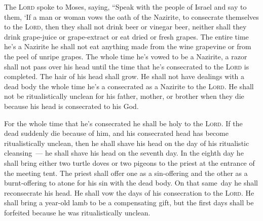 
\begin{inparaenum}
     The \textsc{Lord} spoke to Moses, saying,%
     ``Speak with the people of Israel and say to them, `If a man or woman vows the oath of the Nazirite, to consecrate themselves to the \textsc{Lord},%
     then they shall not drink beer or vinegar beer, neither shall they drink grape-juice or grape-extract or eat dried or fresh grapes.%
     The entire time he's a Nazirite he shall not eat anything made from the wine grapevine or from the peel of unripe grapes.%
     The whole time he's vowed to be a Nazirite, a razor shall not pass over his head until the time that he's consecrated to the \textsc{Lord} is completed. The hair of his head shall grow.%
     He shall not have dealings with a dead body the whole time he's a consecrated as a Nazirite to the \textsc{Lord}.%
     He shall not be ritualistically unclean for his father, mother, or brother when they die because his head is consecrated to his God.%
    
     For the whole time that he's consecrated he shall be holy to the \textsc{Lord}.%
     If the dead suddenly die because of him, and his consecrated head has become ritualistically unclean, then he shall shave his head on the day of his ritualistic cleansing~--- he shall shave his head on the seventh day.%
     In the eighth day he shall bring either two turtle doves or two pigeons to the priest at the entrance of the meeting tent.%
     The priest shall offer one as a sin-offering and the other as a burnt-offering to atone for his sin with the dead body. On that same\understood\ day he shall reconsecrate his head.%
     He shall vow the days of his consecration to the \textsc{Lord}. He shall bring a year-old lamb to be a compensating gift, but the first days shall be forfeited because he was ritualistically unclean.%
    

\end{inparaenum}
